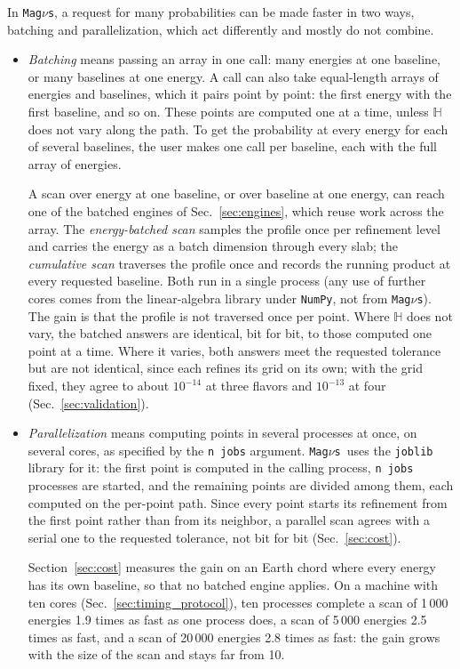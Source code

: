 \documentclass[final,5p,times,twocolumn,sort,compress]{elsarticle}
\makeatletter
\DeclareRobustCommand{\_}{%
  \ifmmode\nfss@text{\textunderscore}\else\textunderscore\allowbreak\fi}
\newcommand{\magnus}{{\tt Mag}\ensuremath{\nu}{\tt s}}
\makeatother
\begin{document}
In \magnus, a request for many probabilities can be made faster in two ways, batching and parallelization, which act differently and mostly do not combine.

\begin{itemize}
\item \emph{Batching} means passing an array in one call: many energies at one baseline, or many baselines at one energy. A call can also take equal-length arrays of energies and baselines, which it pairs point by point: the first energy with the first baseline, and so on. These points are computed one at a time, unless $\mathbb{H}$ does not vary along the path. To get the probability at every energy for each of several baselines, the user makes one call per baseline, each with the full array of energies.

A scan over energy at one baseline, or over baseline at one energy, can reach one of the batched engines of Sec.~\ref{sec:engines}, which reuse work across the array. The \textit{energy-batched scan} samples the profile once per refinement level and carries the energy as a batch dimension through every slab; the \textit{cumulative scan} traverses the profile once and records the running product at every requested baseline. Both run in a single process (any use of further cores comes from the linear-algebra library under {\tt NumPy}, not from \magnus). The gain is that the profile is not traversed once per point. Where $\mathbb{H}$ does not vary, the batched answers are identical, bit for bit, to those computed one point at a time. Where it varies, both answers meet the requested tolerance but are not identical, since each refines its grid on its own; with the grid fixed, they agree to about $10^{-14}$ at three flavors and $10^{-13}$ at four (Sec.~\ref{sec:validation}).
\item \emph{Parallelization} means computing points in several processes at once, on several cores, as specified by the {\tt n\_jobs} argument. \magnus\ uses the {\tt joblib} library for it: the first point is computed in the calling process, {\tt n\_jobs} processes are started, and the remaining points are divided among them, each computed on the per-point path. Since every point starts its refinement from the first point rather than from its neighbor, a parallel scan agrees with a serial one to the requested tolerance, not bit for bit (Sec.~\ref{sec:cost}).

Section~\ref{sec:cost} measures the gain on an Earth chord where every energy has its own baseline, so that no batched engine applies. On a machine with ten cores (Sec.~\ref{sec:timing_protocol}), ten processes complete a scan of 1\,000 energies 1.9 times as fast as one process does, a scan of 5\,000 energies 2.5 times as fast, and a scan of 20\,000 energies 2.8 times as fast: the gain grows with the size of the scan and stays far from 10.
\end{itemize}
\end{document}
